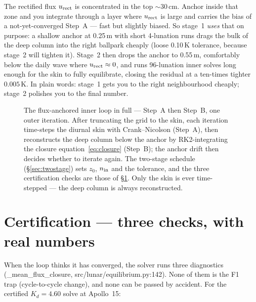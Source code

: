 \documentclass[11pt]{report}
\newcommand{\code}[1]{{\ttfamily\small #1}}
\begin{document}
\noindent The rectified flux $u_{\rm rect}$ is concentrated in the top
$\sim$30\,cm. Anchor inside that zone and you integrate through a layer where
$u_{\rm rect}$ is large and carries the bias of a not-yet-converged Step~A ---
fast but slightly biased. So stage~1 \emph{uses} that on purpose: a shallow
anchor at 0.25\,m with short 4-lunation runs drags the bulk of the deep column
into the right ballpark cheaply (loose 0.10\,K tolerance, because stage~2 will
tighten it). Stage~2 then drops the anchor to 0.55\,m, comfortably below the
daily wave where $u_{\rm rect}\approx0$, and runs 96-lunation inner solves long
enough for the skin to fully equilibrate, closing the residual at a ten-times
tighter $0.005$\,K. In plain words: stage~1 gets you to the right neighbourhood
cheaply; stage~2 polishes you to the final number.

\begin{figure}[p]\centering
\resizebox{!}{0.80\textheight}{}
\caption{The flux-anchored inner loop in full --- Step~A then Step~B, one outer
iteration. After truncating the grid to the skin, each iteration time-steps the
diurnal skin with Crank--Nicolson (Step~A), then reconstructs the deep column
below the anchor by RK2-integrating the closure equation~\eqref{eq:closure}
(Step~B); the anchor drift then decides whether to iterate again. The two-stage
schedule (\S\ref{sec:twostage}) sets $z_0$, $n_{\rm in}$ and the tolerance, and the
three certification checks are those of \S\ref{sec:cert}. Only the skin is ever
time-stepped --- the deep column is always reconstructed.}
\label{fig:stepsABflow}
\end{figure}

\medskip
{}
\par\medskip

\section{Certification --- three checks, with real numbers}\label{sec:cert}

When the loop thinks it has converged, the solver runs three diagnostics
(\code{\_mean\_flux\_closure}, \code{src/lunar/equilibrium.py:142}). None of them
is the F1 trap (cycle-to-cycle change), and none can be passed by accident. For
the certified $K_d=4.60$ solve at Apollo~15:
\end{document}

